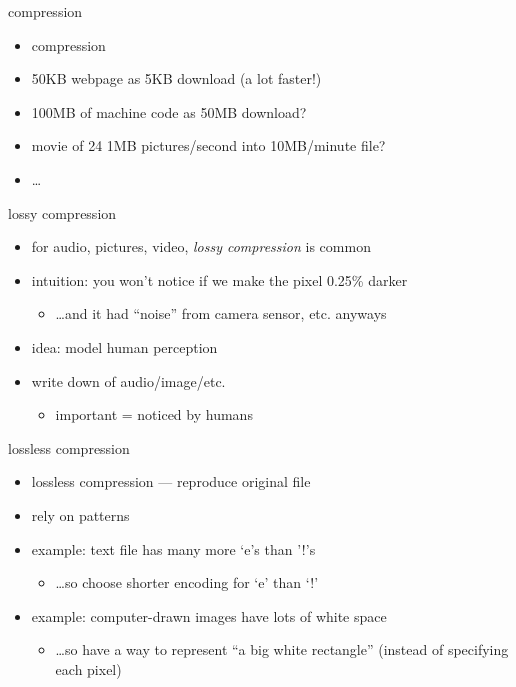 \begin{frame}{compression}
\begin{itemize}
\item compression
\vspace{.5cm}
\item 50KB webpage as 5KB download (a lot faster!) 
\item 100MB of machine code as 50MB download?
\item movie of 24 1MB pictures/second into 10MB/minute file?
\item \ldots
\end{itemize}
\end{frame}

\begin{frame}{lossy compression}
\begin{itemize}
\item for audio, pictures, video, \textit{lossy compression} is common
\item intuition: you won't notice if we make the pixel 0.25\% darker
    \begin{itemize}
    \item \ldots and it had ``noise'' from camera sensor, etc. anyways
    \end{itemize}
\item idea: model human perception
\item write down  of audio/image/etc.
    \begin{itemize}
    \item important = noticed by humans
    \end{itemize}
\end{itemize}
\end{frame}

\begin{frame}{lossless compression}
\begin{itemize}
\item lossless compression --- reproduce original file
\item rely on patterns
\vspace{.5cm}
\item example: text file has many more `e's than '!'s
\begin{itemize}
\item \ldots so choose shorter encoding for `e' than `!'
\end{itemize}
\item example: computer-drawn images have lots of white space
\begin{itemize}
\item \ldots so have a way to represent ``a big white rectangle'' (instead of specifying each pixel)
\end{itemize}
\end{itemize}
\end{frame}

